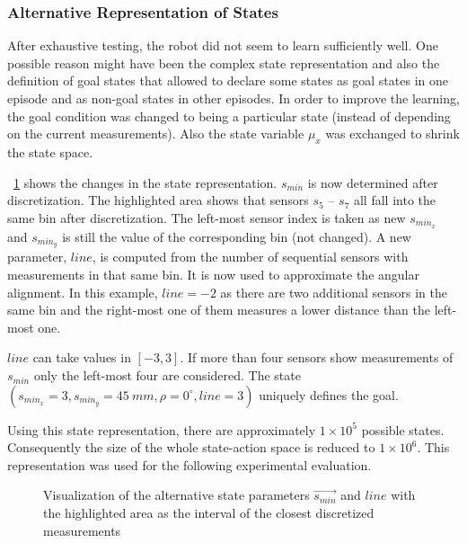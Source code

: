 \subsubsection{Alternative Representation of States}
After exhaustive testing, the robot did not seem to learn sufficiently well. One possible reason might have been the complex state representation and also the definition of goal states that allowed to declare some states as goal states in one episode and as non-goal states in other episodes. In order to improve the learning, the goal condition was changed to being a particular state (instead of depending on the current measurements). Also the state variable $\mu_x$ was exchanged to shrink the state space.

\figurename~\ref{fig:alternative} shows the changes in the state representation. $s_{min}$ is now determined after discretization. The highlighted area shows that sensors $s_5$ -- $s_7$ all fall into the same bin after discretization. The left-most sensor index is taken as new $s_{min_x}$ and $s_{min_y}$ is still the value of the corresponding bin (not changed). A new parameter, $line$, is computed from the number of sequential sensors with measurements in that same bin. It is now used to approximate the angular alignment. In this example, $line = -2$ as there are two additional sensors in the same bin and the right-most one of them measures a lower distance than the left-most one.

$line$ can take values in $[-3,3]$. If more than four sensors show measurements of $s_{min}$ only the left-most four are considered. The state $\left(s_{min_x} = 3, s_{min_y} = 45\:mm, \rho = 0^\circ, line = 3 \right)$ uniquely defines the goal.

Using this state representation, there are approximately $1\times10^5$ possible states. Consequently the size of the whole state-action space is reduced to $1\times10^6$. This representation was used for the following experimental evaluation.

\begin{figure}
    \centering
    \def\svgwidth{0.5 \textwidth}
    
    \caption{Visualization of the alternative state parameters $\vec{s_{min}}$ and $line$ with the highlighted area as the interval of the closest discretized measurements}
    \label{fig:alternative}
\end{figure}




